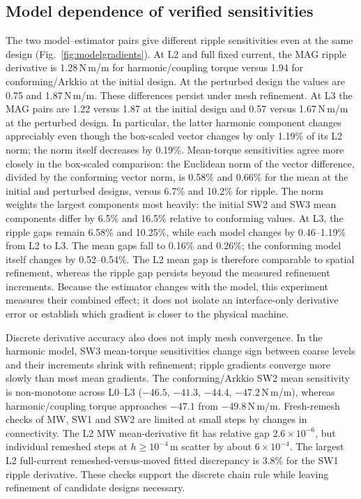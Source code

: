 \documentclass{anvil-paper}
\begin{document}
\subsection*{Model dependence of verified sensitivities}
The two model--estimator pairs give different ripple sensitivities even
at the same design (Fig.~\ref{fig:modelgradients}). At L2 and full fixed
current, the MAG ripple derivative is 1.28\,N\,m/m for harmonic/coupling
torque versus 1.94 for conforming/Arkkio at the initial design. At the
perturbed design the values are 0.75 and 1.87\,N\,m/m. These differences
persist under mesh refinement. At L3 the MAG pairs are 1.22 versus 1.87
at the initial design and 0.57 versus 1.67\,N\,m/m at the perturbed design.
In particular, the latter harmonic component changes appreciably even
though the box-scaled vector changes by only 1.19\% of its L2 norm;
the norm itself decreases by 0.19\%. Mean-torque
sensitivities agree more closely in the box-scaled comparison: the
Euclidean norm of the vector difference, divided by the conforming vector
norm, is 0.58\% and 0.66\% for the mean at the initial and perturbed
designs, versus 6.7\% and 10.2\% for ripple. The norm weights the largest
components most heavily: the initial SW2 and SW3 mean components differ
by 6.5\% and 16.5\% relative to conforming values.
At L3, the ripple gaps remain 6.58\% and 10.25\%, while each model
changes by 0.46--1.19\% from L2 to L3. The mean gaps fall to 0.16\%
and 0.26\%; the conforming model itself changes by 0.52--0.54\%.
The L2 mean gap is therefore comparable to spatial refinement, whereas
the ripple gap persists beyond the measured refinement increments. Because the
estimator changes with the model, this experiment measures their combined
effect; it does not isolate an interface-only derivative error or establish
which gradient is closer to the physical machine.

Discrete derivative accuracy also does not imply mesh convergence. In the
harmonic model, SW3 mean-torque sensitivities change sign between coarse
levels and their increments shrink with refinement; ripple gradients converge
more slowly than most mean gradients. The conforming/Arkkio SW2 mean
sensitivity is non-monotone across L0--L3 ($-46.5$, $-41.3$, $-44.4$,
$-47.2$\,N\,m/m), whereas harmonic/coupling torque approaches $-47.1$
from $-49.8$\,N\,m/m. Fresh-remesh checks of MW, SW1 and SW2 are limited
at small steps by changes in connectivity. The L2 MW mean-derivative fit
has relative gap $2.6\times10^{-6}$, but individual remeshed steps at
$h\geq10^{-4}$\,m scatter by about $6\times10^{-4}$. The largest L2 full-current
remeshed-versus-moved fitted discrepancy is 3.8\% for the SW1 ripple
derivative. These checks support the discrete chain rule while leaving
refinement of candidate designs necessary.
\end{document}
